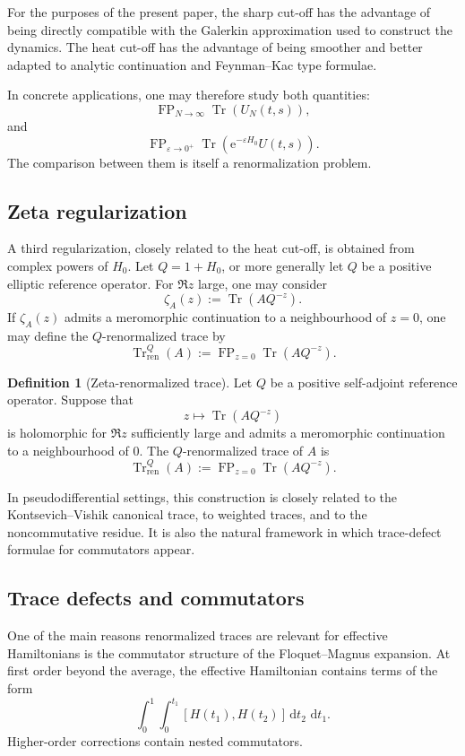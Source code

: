 \documentclass[11pt]{amsart}
\theoremstyle{plain}
\theoremstyle{definition}
\newtheorem{definition}[theorem]{Definition}
\theoremstyle{remark}
\newcommand{\Tr}{\operatorname{Tr}}
\newcommand{\FP}{\operatorname{FP}}
\newcommand{\ee}{\mathrm e}
\newcommand{\dd}{\,\mathrm d}
\begin{document}
For the purposes of the present paper, the sharp cut-off has the
advantage of being directly compatible with the Galerkin approximation
used to construct the dynamics.  The heat cut-off has the advantage of
being smoother and better adapted to analytic continuation and
Feynman--Kac type formulae.

In concrete applications, one may therefore study both quantities:
\[
        \FP_{N\to\infty}\Tr(U_N(t,s)),
\]
and
\[
        \FP_{\varepsilon\to0^+}
        \Tr(\ee^{-\varepsilon H_0}U(t,s)).
\]
The comparison between them is itself a renormalization problem.

\subsection{Zeta regularization}

A third regularization, closely related to the heat cut-off, is obtained
from complex powers of \(H_0\).  Let \(Q=1+H_0\), or more generally let
\(Q\) be a positive elliptic reference operator.  For \(\Re z\) large,
one may consider
\[
        \zeta_A(z)
        :=
        \Tr(AQ^{-z}).
\]
If \(\zeta_A(z)\) admits a meromorphic continuation to a neighbourhood
of \(z=0\), one may define the \(Q\)-renormalized trace by
\[
        \Tr_{\mathrm{ren}}^Q(A)
        :=
        \FP_{z=0}\Tr(AQ^{-z}).
\]

\begin{definition}[Zeta-renormalized trace]
Let \(Q\) be a positive self-adjoint reference operator.  Suppose that
\[
        z\mapsto \Tr(AQ^{-z})
\]
is holomorphic for \(\Re z\) sufficiently large and admits a meromorphic
continuation to a neighbourhood of \(0\).  The \(Q\)-renormalized trace
of \(A\) is
\[
        \Tr_{\mathrm{ren}}^Q(A)
        :=
        \FP_{z=0}\Tr(AQ^{-z}).
\]
\end{definition}

In pseudodifferential settings, this construction is closely related to
the Kontsevich--Vishik canonical trace, to weighted traces, and to the
noncommutative residue.  It is also the natural framework in which
trace-defect formulae for commutators appear.

\subsection{Trace defects and commutators}

One of the main reasons renormalized traces are relevant for effective
Hamiltonians is the commutator structure of the Floquet--Magnus
expansion.  At first order beyond the average, the effective
Hamiltonian contains terms of the form
\[
        \int_0^1\int_0^{t_1}
        [H(t_1),H(t_2)]
        \dd t_2\,\dd t_1.
\]
Higher-order corrections contain nested commutators.
\end{document}
